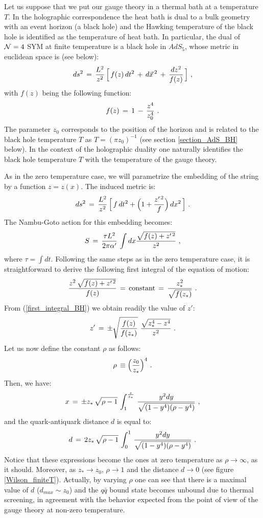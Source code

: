 \documentclass[12pt,notitlepage,a4paper]{article}
\newcommand{\beq}{\begin{equation}}
\newcommand{\eeq}{\end{equation}}
\begin{document}
Let us suppose that we put our gauge theory in a thermal bath at a temperature $T$. In the holographic correspondence the heat bath is dual to a bulk geometry with an event horizon (a black hole) and the Hawking temperature of the black hole is identified as the temperature of heat bath.  In particular, the dual of ${\cal N}=4$ SYM at finite temperature is a black hole in $AdS_5$, whose metric  in euclidean space is (see below):
\beq
ds^2\,=\,{L^2\over z^2}\,\Big[\,f(z)\,dt^2\,+\,d\vec x^{\,2}\,+\,{dz^2\over f(z)}\,\Big]\,\,,
\eeq
 with $f(z)$ being the following function:
 \beq
 f(z)\,=\,1\,-\,{z^4\over z_0^4}\,\,.
 \eeq
The parameter $z_0$ corresponds to the position of the horizon and is related to the black hole temperature $T$ as $T=(\pi z_0)^{-1}$ (see section \ref{section_AdS_BH} below).  In the context of the holographic duality one naturally identifies the black hole temperature $T$ with the temperature of the gauge theory.  




As in the zero temperature case, we will parametrize the embedding of the string by a function $z=z(x)$. The induced metric is:
\beq
ds^2\,=\, {L^2\over z^2}\,\Big[\,f\,dt^2+\Big(1+{z'^{\,2}\over f}\Big)\,dx^2\,\Big]\,\,.
\eeq
The Nambu-Goto action for this embedding becomes:
\beq
S\,=\,{\tau L^2\over 2\pi\alpha'}\,\int dx 
{\sqrt{f(z)+z'^{\,2}}\over z^2}\,\,,
\eeq
where $\tau=\int dt$. Following the same steps as in the zero temperature case, it is straightforward to derive the following first integral of the equation of motion:
\beq
{z^2\,\sqrt{f(z)+z'^{\,2}}\over f(z)}\,=\,{\rm constant}\,=\,{z_*^2\over \sqrt{f(z_*)}}\,\,.
\label{first_integral_BH}
\eeq
From (\ref{first_integral_BH}) we obtain readily the value of $z'$:
\beq
z'\,=\,\pm \sqrt{{f(z)\over f(z_*)}}\,\,
{\sqrt{z_*^4-z^4}\over z^2}\,\,.
\eeq
Let us now define the constant $\rho$ as follows:
\beq
\rho\,\equiv \Big({z_0\over z_*}\Big)^4\,\,.
\label{rho_def}
\eeq
Then, we have:
\beq
x\,=\,\pm z_*\,\sqrt{\rho-1}\,
\int_{1}^{{z\over z_*}}\,
{y^2 dy\over \sqrt{(1-y^4)(\rho-y^4)}}\,\,,
\eeq
and the quark-antiquark distance $d$ is equal to:
\beq
d\,=\,2 z_*\,\sqrt{\rho-1}\,
\int_{0}^{1}\,
{y^2 dy\over \sqrt{(1-y^4)(\rho-y^4)}}\,\,.
\eeq
Notice that these expressions become the ones at zero temperature as $\rho\to\infty$, as it should. Moreover, as  $z_*\to z_0$, $\rho\to 1$ and  the distance $d\to 0$ (see figure \ref{Wilson_finiteT}). Actually, by varying $\rho$ one can see that there is a maximal value of $d$ ($d_{max}\sim z_0$) and the $q\bar q$ bound state becomes unbound due to thermal screening, in agreement with the behavior expected from the point of view of the gauge theory at non-zero temperature. 
\end{document}
